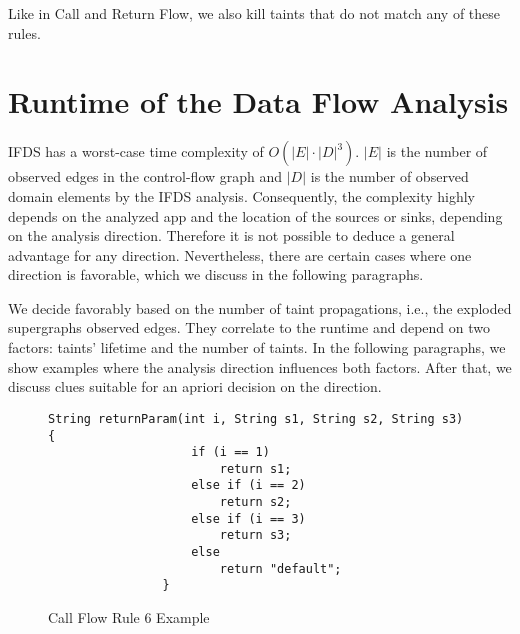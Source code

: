 \documentclass[../draft.tex]{subfiles}
\begin{document}
    Like in Call and Return Flow, we also kill taints that do not match any of these rules.

    \section{Runtime of the Data Flow Analysis}\label{s:complexity}
    IFDS has a worst-case time complexity of $O(|E| \cdot |D|^3)$. $|E|$ is the number of observed edges in the control-flow graph and $|D|$ is the number of observed domain elements by the IFDS analysis.
    Consequently, the complexity highly depends on the analyzed app and the location of the sources or sinks, depending on the analysis direction.
    Therefore it is not possible to deduce a general advantage for any direction.
    Nevertheless, there are certain cases where one direction is favorable, which we discuss in the following paragraphs.

    We decide favorably based on the number of taint propagations, i.e., the exploded supergraphs observed edges.
    They correlate to the runtime and depend on two factors: taints' lifetime and the number of taints.
    In the following paragraphs, we show examples where the analysis direction influences both factors.
    After that, we discuss clues suitable for an apriori decision on the direction.

    \begin{figure}[tbp]
        \centering
        \begin{adjustbox}{max width=\textwidth}
            \begin{lstlisting}[gobble=16]
                String returnParam(int i, String s1, String s2, String s3) {
                    if (i == 1)
                        return s1;
                    else if (i == 2)
                        return s2;
                    else if (i == 3)
                        return s3;
                    else
                        return "default";
                }
            \end{lstlisting}
        \end{adjustbox}
        \caption{Call Flow Rule 6 Example}
        \label{lst:branching}
    \end{figure}
\end{document}
